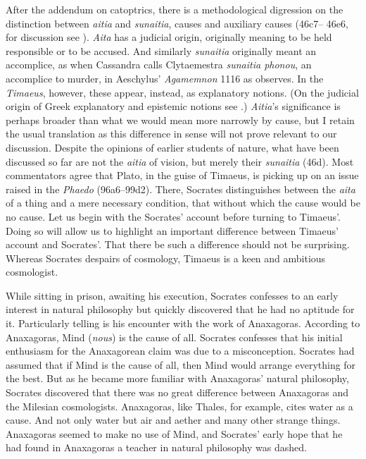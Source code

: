 After the addendum on catoptrics, there is a methodological digression on the distinction between \emph{aitia} and \emph{sunaitia}, causes and auxiliary causes (46c7–
46e6, for discussion see \citealt{Strange:1985aa}). \emph{Aita} has a judicial origin, originally meaning to be held responsible or to be accused. And similarly \emph{sunaitia} originally meant an accomplice, as when Cassandra calls Clytaemestra \emph{sunaitia phonou}, an accomplice to murder, in Aeschylus' \emph{Agamemnon} 1116 as \citet[291]{Taylor:1928qb} observes. In the \emph{Timaeus}, however, these appear, instead, as explanatory notions. (On the judicial origin of Greek explanatory and epistemic notions see \citealt[chapter 4]{Lloyd:1979lc}.) \emph{Aitia}'s significance is perhaps broader than what we would mean more narrowly by cause, but I retain the usual translation as this difference in sense will not prove relevant to our discussion. Despite the opinions of earlier students of nature, what have been discussed so far are not the \emph{aitia} of vision, but merely their \emph{sunaitia} (46d). Most commentators agree that Plato, in the guise of Timaeus, is picking up on an issue raised in the \emph{Phaedo} (96a6--99d2). There, Socrates distinguishes between the \emph{aita} of a thing and a mere necessary condition, that without which the cause would be no cause. Let us begin with the Socrates' account before turning to Timaeus'. Doing so will allow us to highlight an important difference between Timaeus' account and Socrates'. That there be such a difference should not be surprising. Whereas Socrates despairs of cosmology, Timaeus is a keen and ambitious cosmologist.

While sitting in prison, awaiting his execution, Socrates confesses to an early interest in natural philosophy but quickly discovered that he had no aptitude for it. Particularly telling is his encounter with the work of Anaxagoras. According to Anaxagoras, Mind (\emph{nous}) is the cause of all. Socrates confesses that his initial enthusiasm for the Anaxagorean claim was due to a misconception. Socrates had assumed that if Mind is the cause of all, then Mind would arrange everything for the best. But as he became more familiar with Anaxagoras' natural philosophy, Socrates discovered that there was no great difference between Anaxagoras and the Milesian cosmologists. Anaxagoras, like Thales, for example, cites water as a cause. And not only water but air and aether and many other strange things. Anaxagoras seemed to make no use of Mind, and Socrates' early hope that he had found in Anaxagoras a teacher in natural philosophy was dashed. 

